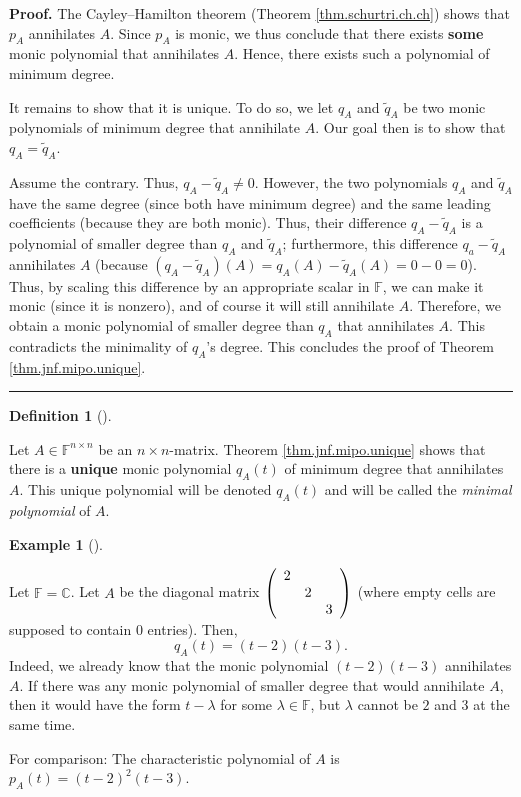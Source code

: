 \documentclass[numbers=enddot,12pt,final,onecolumn,notitlepage]{scrartcl}%
\numberwithin{exer}{subsection}
\theoremstyle{definition}
\newtheorem{defi}[theo]{Definition}
\newenvironment{definition}[1][]
{\begin{defi}[#1]\begin{leftbar}}
{\end{leftbar}\end{defi}}
\newtheorem{exam}[theo]{Example}
\newenvironment{example}[1][]
{\begin{exam}[#1]\begin{leftbar}}
{\end{leftbar}\end{exam}}
\newenvironment{proof}[1][Proof]{\noindent\textbf{#1.} }{\ \rule{0.5em}{0.5em}}
\begin{document}
\begin{proof}
The Cayley--Hamilton theorem (Theorem \ref{thm.schurtri.ch.ch}) shows that
$p_{A}$ annihilates $A$. Since $p_{A}$ is monic, we thus conclude that there
exists \textbf{some} monic polynomial that annihilates $A$. Hence, there
exists such a polynomial of minimum degree.

It remains to show that it is unique. To do so, we let $q_{A}$ and
$\widetilde{q}_{A}$ be two monic polynomials of minimum degree that annihilate
$A$. Our goal then is to show that $q_{A}=\widetilde{q}_{A}$.

Assume the contrary. Thus, $q_{A}-\widetilde{q}_{A}\neq0$. However, the two
polynomials $q_{A}$ and $\widetilde{q}_{A}$ have the same degree (since both
have minimum degree) and the same leading coefficients (because they are both
monic). Thus, their difference $q_{A}-\widetilde{q}_{A}$ is a polynomial of
smaller degree than $q_{A}$ and $\widetilde{q}_{A}$; furthermore, this
difference $q_{a}-\widetilde{q}_{A}$ annihilates $A$ (because $\left(
q_{A}-\widetilde{q}_{A}\right)  \left(  A\right)  =q_{A}\left(  A\right)
-\widetilde{q}_{A}\left(  A\right)  =0-0=0$). Thus, by scaling this difference
by an appropriate scalar in $\mathbb{F}$, we can make it monic (since it is
nonzero), and of course it will still annihilate $A$. Therefore, we obtain a
monic polynomial of smaller degree than $q_{A}$ that annihilates $A$. This
contradicts the minimality of $q_{A}$'s degree. This concludes the proof of
Theorem \ref{thm.jnf.mipo.unique}.
\end{proof}

\begin{definition}
\label{def.jnf.mipo.mipo}Let $A\in\mathbb{F}^{n\times n}$ be an $n\times
n$-matrix. Theorem \ref{thm.jnf.mipo.unique} shows that there is a
\textbf{unique} monic polynomial $q_{A}\left(  t\right)  $ of minimum degree
that annihilates $A$. This unique polynomial will be denoted $q_{A}\left(
t\right)  $ and will be called the \emph{minimal polynomial} of $A$.
\end{definition}

\begin{example}
Let $\mathbb{F}=\mathbb{C}$. Let $A$ be the diagonal matrix $\left(
\begin{array}
[c]{ccc}%
2 &  & \\
& 2 & \\
&  & 3
\end{array}
\right)  $ (where empty cells are supposed to contain $0$ entries). Then,%
\[
q_{A}\left(  t\right)  =\left(  t-2\right)  \left(  t-3\right)  .
\]
Indeed, we already know that the monic polynomial $\left(  t-2\right)  \left(
t-3\right)  $ annihilates $A$. If there was any monic polynomial of smaller
degree that would annihilate $A$, then it would have the form $t-\lambda$ for
some $\lambda\in\mathbb{F}$, but $\lambda$ cannot be $2$ and $3$ at the same time.

For comparison: The characteristic polynomial of $A$ is $p_{A}\left(
t\right)  =\left(  t-2\right)  ^{2}\left(  t-3\right)  $.
\end{example}
\end{document}
